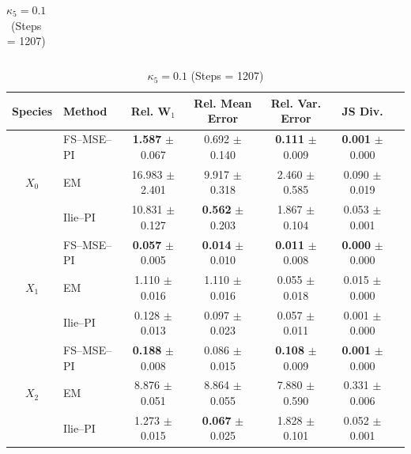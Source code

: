\documentclass{article}
\begin{document}
\begin{table}[htpb]
\begin{subtable}{\textwidth}
\begin{tabular}{clccccc}
\bottomrule
\end{tabular}
\end{subtable}

\vspace{0em}

\begin{subtable}{\textwidth}
\centering
\caption{$\kappa_5 = 0.1$ (Steps = 1207)}
\begin{tabular}{clccccc}
\toprule
Species & Method & Rel. W$_1$ & Rel. Mean Error & Rel. Var. Error & JS Div.\\
\midrule
\multirow{3}{*}{$X_0$}
& FS–MSE–PI
& \textbf{1.587} $\pm$ 0.067
& 0.692 $\pm$ 0.140
& \textbf{0.111} $\pm$ 0.009
& \textbf{0.001} $\pm$ 0.000\\
& EM
& 16.983 $\pm$ 2.401
& 9.917 $\pm$ 0.318
& 2.460 $\pm$ 0.585
& 0.090 $\pm$ 0.019\\
& Ilie--PI
& 10.831 $\pm$ 0.127
& \textbf{0.562} $\pm$ 0.203
& 1.867 $\pm$ 0.104
& 0.053 $\pm$ 0.001\\
\midrule
\multirow{3}{*}{$X_1$}
& FS–MSE–PI
& \textbf{0.057} $\pm$ 0.005
& \textbf{0.014} $\pm$ 0.010
& \textbf{0.011} $\pm$ 0.008
& \textbf{0.000} $\pm$ 0.000\\
& EM
& 1.110 $\pm$ 0.016
& 1.110 $\pm$ 0.016
& 0.055 $\pm$ 0.018
& 0.015 $\pm$ 0.000\\
& Ilie--PI
& 0.128 $\pm$ 0.013
& 0.097 $\pm$ 0.023
& 0.057 $\pm$ 0.011
& 0.001 $\pm$ 0.000\\
\midrule
\multirow{3}{*}{$X_2$}
& FS–MSE–PI
& \textbf{0.188} $\pm$ 0.008
& 0.086 $\pm$ 0.015
& \textbf{0.108} $\pm$ 0.009
& \textbf{0.001} $\pm$ 0.000\\
& EM
& 8.876 $\pm$ 0.051
& 8.864 $\pm$ 0.055
& 7.880 $\pm$ 0.590
& 0.331 $\pm$ 0.006\\
& Ilie--PI
& 1.273 $\pm$ 0.015
& \textbf{0.067} $\pm$ 0.025
& 1.828 $\pm$ 0.101
& 0.052 $\pm$ 0.001\\

\bottomrule
\end{tabular}
\end{subtable}

\vspace{0em}


\end{table}
\end{document}
